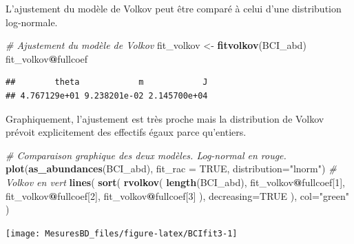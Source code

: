 \documentclass[
  11pt,
  american,
  a4paper,
  extrafontsizes,onecolumn,openright
  ]{memoir}
\newenvironment{Shaded}{\begin{snugshade}}{\end{snugshade}}
\newcommand{\AttributeTok}[1]{\textcolor[rgb]{0.13,0.29,0.53}{#1}}
\newcommand{\CommentTok}[1]{\textcolor[rgb]{0.56,0.35,0.01}{\textit{#1}}}
\newcommand{\ConstantTok}[1]{\textcolor[rgb]{0.56,0.35,0.01}{#1}}
\newcommand{\DecValTok}[1]{\textcolor[rgb]{0.00,0.00,0.81}{#1}}
\newcommand{\FunctionTok}[1]{\textcolor[rgb]{0.13,0.29,0.53}{\textbf{#1}}}
\newcommand{\NormalTok}[1]{#1}
\newcommand{\OtherTok}[1]{\textcolor[rgb]{0.56,0.35,0.01}{#1}}
\newcommand{\SpecialCharTok}[1]{\textcolor[rgb]{0.81,0.36,0.00}{\textbf{#1}}}
\newcommand{\StringTok}[1]{\textcolor[rgb]{0.31,0.60,0.02}{#1}}
\begin{document}
\normalsize

L'ajustement du modèle de Volkov peut être comparé à celui d'une distribution log-normale.

\scriptsize

\begin{Shaded}
\begin{Highlighting}[]
\CommentTok{\# Ajustement du modèle de Volkov}
\NormalTok{fit\_volkov }\OtherTok{\textless{}{-}} \FunctionTok{fitvolkov}\NormalTok{(BCI\_abd)}
\NormalTok{fit\_volkov}\SpecialCharTok{@}\NormalTok{fullcoef}
\end{Highlighting}
\end{Shaded}

\begin{verbatim}
##        theta            m            J 
## 4.767129e+01 9.238201e-02 2.145700e+04
\end{verbatim}

\normalsize

Graphiquement, l'ajustement est très proche mais la distribution de Volkov prévoit explicitement des effectifs égaux parce qu'entiers.

\scriptsize

\begin{Shaded}
\begin{Highlighting}[]
\CommentTok{\# Comparaison graphique des deux modèles. Log{-}normal en rouge.}
\FunctionTok{plot}\NormalTok{(}\FunctionTok{as\_abundances}\NormalTok{(BCI\_abd), }\AttributeTok{fit\_rac =} \ConstantTok{TRUE}\NormalTok{, }\AttributeTok{distribution=}\StringTok{"lnorm"}\NormalTok{)}
\CommentTok{\# Volkov en vert}
\FunctionTok{lines}\NormalTok{(}
  \FunctionTok{sort}\NormalTok{(}
    \FunctionTok{rvolkov}\NormalTok{(}
      \FunctionTok{length}\NormalTok{(BCI\_abd), }
\NormalTok{      fit\_volkov}\SpecialCharTok{@}\NormalTok{fullcoef[}\DecValTok{1}\NormalTok{], }
\NormalTok{      fit\_volkov}\SpecialCharTok{@}\NormalTok{fullcoef[}\DecValTok{2}\NormalTok{], }
\NormalTok{      fit\_volkov}\SpecialCharTok{@}\NormalTok{fullcoef[}\DecValTok{3}\NormalTok{]}
\NormalTok{    ), }
    \AttributeTok{decreasing=}\ConstantTok{TRUE}
\NormalTok{  ), }
  \AttributeTok{col=}\StringTok{"green"}
\NormalTok{)}
\end{Highlighting}
\end{Shaded}

\begin{center}\texttt{[image: MesuresBD\_files/figure-latex/BCIfit3-1]} \end{center}
\end{document}
